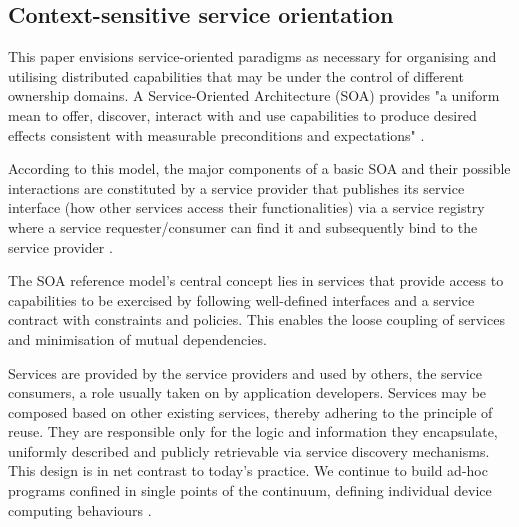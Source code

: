 
\subsection{Context-sensitive service orientation}

This paper envisions service-oriented paradigms as necessary for organising and utilising distributed capabilities that may be under the control of different ownership domains. A Service-Oriented Architecture (SOA) provides "a uniform mean to offer, discover, interact with and use capabilities to produce desired effects consistent with measurable preconditions and expectations" \cite{mackenzie2006reference}.

According to this model, the major components of a basic SOA and their possible interactions are constituted by a service provider that publishes its service interface (how other services access their functionalities) via a service registry where a service requester/consumer can find it and subsequently bind to the service provider \cite{haller2008internet}.

The SOA reference model's central concept lies in services that provide access to capabilities to be exercised by following well-defined interfaces and a service contract with constraints and policies. This enables the loose coupling of services and minimisation of mutual dependencies.

Services are provided by the service providers and used by others, the service consumers, a role usually taken on by application developers. Services may be composed based on other existing services, thereby adhering to the principle of reuse. They are responsible only for the logic and information they encapsulate, uniformly described and publicly retrievable via service discovery mechanisms. This design is in net contrast to today's practice. We continue to build ad-hoc programs confined in single points of the continuum, defining individual device computing behaviours \cite{beckman2020harnessing}.

